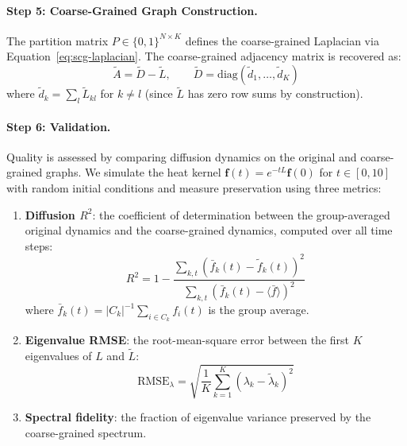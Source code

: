 \paragraph{Step 5: Coarse-Grained Graph Construction.}
The partition matrix $P \in \{0,1\}^{N \times K}$ defines the coarse-grained Laplacian via Equation~\eqref{eq:scg-laplacian}. The coarse-grained adjacency matrix is recovered as:
\begin{equation}
    \tilde{A} = \tilde{D} - \tilde{L}, \qquad \tilde{D} = \mathrm{diag}(\tilde{d}_1, \ldots, \tilde{d}_K)
    \label{eq:scg-adj}
\end{equation}
where $\tilde{d}_k = \sum_{l} \tilde{L}_{kl}$ for $k \neq l$ (since $\tilde{L}$ has zero row sums by construction).

\paragraph{Step 6: Validation.}
Quality is assessed by comparing diffusion dynamics on the original and coarse-grained graphs. We simulate the heat kernel $\mathbf{f}(t) = e^{-tL}\mathbf{f}(0)$ for $t \in [0, 10]$ with random initial conditions and measure preservation using three metrics:

\begin{enumerate}
    \item \textbf{Diffusion $R^2$}: the coefficient of determination between the group-averaged original dynamics and the coarse-grained dynamics, computed over all time steps:
    \begin{equation}
        R^2 = 1 - \frac{\sum_{k,t} \left(\bar{f}_k(t) - \tilde{f}_k(t)\right)^2}{\sum_{k,t} \left(\bar{f}_k(t) - \langle \bar{f} \rangle\right)^2}
        \label{eq:r2-diffusion}
    \end{equation}
    where $\bar{f}_k(t) = |C_k|^{-1}\sum_{i \in C_k} f_i(t)$ is the group average.

    \item \textbf{Eigenvalue RMSE}: the root-mean-square error between the first $K$ eigenvalues of $L$ and $\tilde{L}$:
    \begin{equation}
        \text{RMSE}_\lambda = \sqrt{\frac{1}{K}\sum_{k=1}^{K}\left(\lambda_k - \tilde{\lambda}_k\right)^2}
        \label{eq:rmse-eigenval}
    \end{equation}

    \item \textbf{Spectral fidelity}: the fraction of eigenvalue variance preserved by the coarse-grained spectrum.
\end{enumerate}


